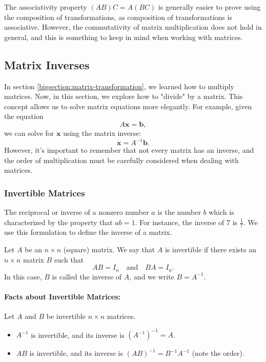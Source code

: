 \documentclass[a4paper,12pt]{article}
\begin{document}
The associativity property \( (AB)C = A(BC) \) is generally easier to prove using the composition of transformations, as composition of transformations is associative. However, the commutativity of matrix multiplication does not hold in general, and this is something to keep in mind when working with matrices.

\subsection{Matrix Inverses}In section \ref{bigsection:matrix-transformation}, we learned how to multiply matrices. Now, in this section, we explore how to "divide" by a matrix. This concept allows us to solve matrix equations more elegantly. For example, given the equation
\[
A \mathbf{x} = \mathbf{b},
\]
we can solve for \( \mathbf{x} \) using the matrix inverse:
\[
\mathbf{x} = A^{-1} \mathbf{b}.
\]
However, it's important to remember that not every matrix has an inverse, and the order of multiplication must be carefully considered when dealing with matrices.

\subsubsection{Invertible Matrices}The reciprocal or inverse of a nonzero number \(a\) is the number \(b\) which is characterized by the property that \(a b = 1\). For instance, the inverse of \(7\) is \(\frac{1}{7}\). We use this formulation to define the inverse of a matrix.

\begin{tcolorbox}[title=Definition,colframe=blue!70!black, colback=blue!5!white]
Let \( A \) be an \( n \times n \) (square) matrix. We say that \( A \) is invertible if there exists an \( n \times n \) matrix \( B \) such that
\[
A B = I_n \quad \text{and} \quad B A = I_n.
\]
In this case, \( B \) is called the inverse of \( A \), and we write \( B = A^{-1} \).
\end{tcolorbox}
\paragraph{Facts about Invertible Matrices:}Let \( A \) and \( B \) be invertible \( n \times n \) matrices. 

\begin{itemize}
    \item \( A^{-1} \) is invertible, and its inverse is \( (A^{-1})^{-1} = A \).
    \item \( AB \) is invertible, and its inverse is \( (AB)^{-1} = B^{-1} A^{-1} \) (note the order).
\end{itemize}
\end{document}
